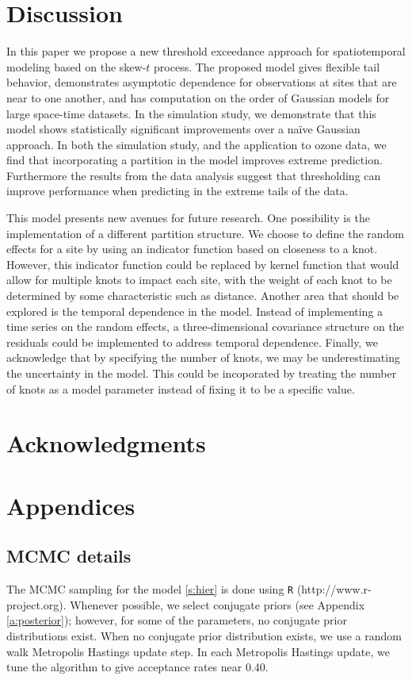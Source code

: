 \documentclass[11pt]{article}
\begin{document}
\section{Discussion}\label{s:con}
In this paper we propose a new threshold exceedance approach for spatiotemporal modeling based on the skew-$t$ process.
The proposed model gives flexible tail behavior, demonstrates asymptotic dependence for observations at sites that are near to one another, and has computation on the order of Gaussian models for large space-time datasets.
In the simulation study, we demonstrate that this model shows statistically significant improvements over a na\"{i}ve Gaussian approach.
In both the simulation study, and the application to ozone data, we find that incorporating a partition in the model improves extreme prediction.
Furthermore the results from the data analysis suggest that thresholding can improve performance when predicting in the extreme tails of the data.

This model presents new avenues for future research.
One possibility is the implementation of a different partition structure.
We choose to define the random effects for a site by using an indicator function based on closeness to a knot.
However, this indicator function could be replaced by kernel function that would allow for multiple knots to impact each site, with the weight of each knot to be determined by some characteristic such as distance.
Another area that should be explored is the temporal dependence in the model.
Instead of implementing a time series on the random effects, a three-dimensional covariance structure on the residuals could be implemented to address temporal dependence.
Finally, we acknowledge that by specifying the number of knots, we may be underestimating the uncertainty in the model.
This could be incoporated by treating the number of knots as a model parameter instead of fixing it to be a specific value.

\section*{Acknowledgments}

\appendix
\section{Appendices}
\subsection{MCMC details} \label{a:mcmc}
The MCMC sampling for the model \ref{s:hier} is done using {\tt R} (http://www.r-project.org). Whenever possible, we select conjugate priors (see Appendix \ref{a:posterior}); however, for some of the parameters, no conjugate prior distributions exist.
When no conjugate prior distribution exists, we use a random walk Metropolis Hastings update step.
In each Metropolis Hastings update, we tune the algorithm to give acceptance rates near 0.40.
\end{document}

